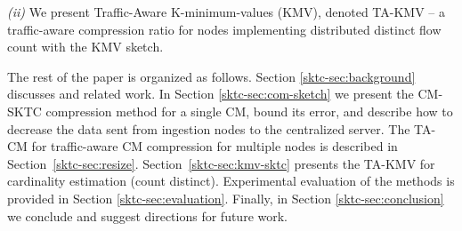 \emph{(ii)} We present Traffic-Aware K-minimum-values (KMV), denoted TA-KMV -- a traffic-aware compression ratio for nodes implementing distributed distinct flow count with the KMV sketch.






The rest of the paper is organized as follows. Section \ref{sktc-sec:background} discusses  and related work. In Section \ref{sktc-sec:com-sketch} we present the CM-SKTC compression method for a single CM, bound its error, and describe how to decrease the data sent from ingestion nodes to the centralized server. 
The TA-CM for traffic-aware CM compression for multiple nodes is described in Section~\ref{sktc-sec:resize}.  
Section~\ref{sktc-sec:kmv-sktc} presents the TA-KMV for cardinality estimation (count distinct). Experimental evaluation of the methods is provided in Section \ref{sktc-sec:evaluation}. Finally, in Section \ref{sktc-sec:conclusion} we conclude and suggest directions for future work.